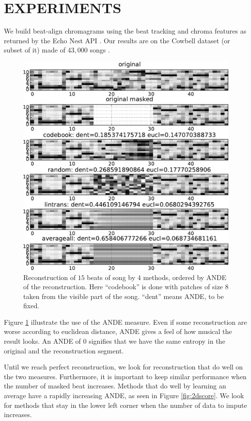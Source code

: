 \documentclass{article}
\begin{document}
\section{EXPERIMENTS}
\label{sec:experiments}
We build beat-align chromagrams using the beat tracking and chroma features as
returned by the Echo Nest API \cite{EchoNest}. Our results are on the Cowbell
dataset (or subset of it) made of $43,000$ songs \cite{Bertin-Mahieux2010a}.

\begin{figure}[t]
\begin{center}
\includegraphics[width=.9\columnwidth]{recon_per_dent}
\end{center}
\caption{Reconstruction of $15$ beats of song by $4$ methods, ordered by
ANDE of the reconstruction. Here ``codebook'' is done with patches of 
size $8$ taken from the visible part of the song. ``dent'' means ANDE,
to be fixed.}
\label{fig:dent}
\end{figure}

Figure \ref{fig:dent} illustrate the use of the ANDE measure. Even if some
reconstruction are worse according to euclidean distance, ANDE gives a feel
of how musical the result looks. An ANDE of $0$ signifies that we have the 
same entropy in the original and the reconstruction segment.

Until we reach perfect reconstruction, we look for reconstruction that do
well on the two measures. Furthermore, it is important to keep similar
performance when the number of masked beat increases. Methods that do
well by learning an average have a rapidly increasing ANDE, as seen in
Figure \ref{fig:2dscore}. We look for methods that stay in the lower left
corner when the number of data to impute increases.
\end{document}
